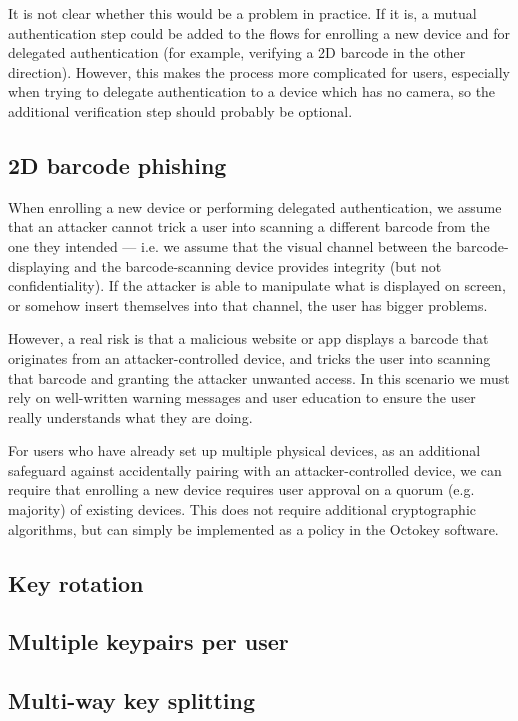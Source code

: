 It is not clear whether this would be a problem in practice. If it is, a mutual authentication step
could be added to the flows for enrolling a new device and for delegated authentication (for
example, verifying a 2D barcode in the other direction). However, this makes the process more
complicated for users, especially when trying to delegate authentication to a device which has no
camera, so the additional verification step should probably be optional.

\subsection{2D barcode phishing}\label{sec:barcode-phishing}

When enrolling a new device or performing delegated authentication, we assume that an attacker
cannot trick a user into scanning a different barcode from the one they intended --- i.e. we assume
that the visual channel between the barcode-displaying and the barcode-scanning device provides
integrity (but not confidentiality). If the attacker is able to manipulate what is displayed on
screen, or somehow insert themselves into that channel, the user has bigger problems.

However, a real risk is that a malicious website or app displays a barcode that originates from an
attacker-controlled device, and tricks the user into scanning that barcode and granting the attacker
unwanted access. In this scenario we must rely on well-written warning messages and user education
to ensure the user really understands what they are doing.

For users who have already set up multiple physical devices, as an additional safeguard against
accidentally pairing with an attacker-controlled device, we can require that enrolling a new device
requires user approval on a quorum (e.g. majority) of existing devices. This does not require
additional cryptographic algorithms, but can simply be implemented as a policy in the Octokey
software.

\subsection{Key rotation}
\subsection{Multiple keypairs per user}
\subsection{Multi-way key splitting}
